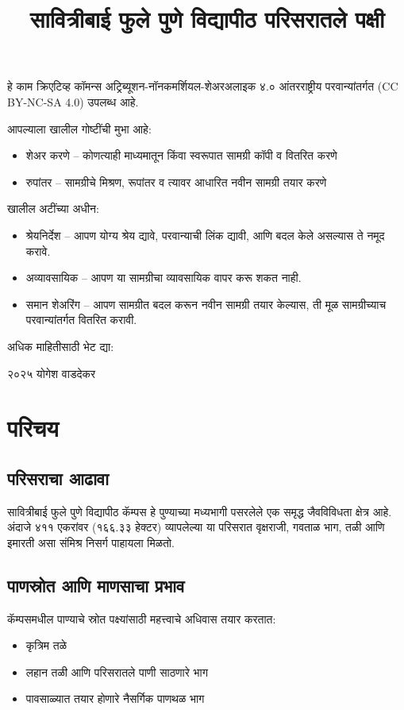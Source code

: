 \documentclass[a4paper,12pt,landscape]{memoir}
\title{सावित्रीबाई फुले पुणे विद्यापीठ परिसरातले पक्षी}
\author{}
\date{}
\newcommand{\introsection}[2]{%
  \begin{minipage}[t]{0.48\textwidth}
    \begin{mdframed}[
      linecolor=headingcolor,
      linewidth=1pt,
      roundcorner=5pt,
      leftmargin=0pt,
      rightmargin=0pt,
      backgroundcolor=headingcolor!5
    ]
      #1
    \end{mdframed}
  \end{minipage}\hfill
  \begin{minipage}[t]{0.48\textwidth}
    \begin{mdframed}[
      linecolor=headingcolor,
      linewidth=1pt,
      roundcorner=5pt,
      leftmargin=0pt,
      rightmargin=0pt,
      backgroundcolor=headingcolor!5
    ]
      #2
    \end{mdframed}
  \end{minipage}
  \newpage
}
\begin{document}
\maketitle

\begin{center}
\vspace{1cm}
{\large हे काम क्रिएटिव्ह कॉमन्स अट्रिब्यूशन-नॉनकमर्शियल-शेअरअलाइक ४.० आंतरराष्ट्रीय परवान्यांतर्गत ({\latintext CC BY-NC-SA 4.0}) उपलब्ध आहे.}

\vspace{0.5cm}
{\normalsize आपल्याला खालील गोष्टींची मुभा आहे:
\begin{itemize}
\item शेअर करणे -- कोणत्याही माध्यमातून किंवा स्वरूपात सामग्री कॉपी व वितरित करणे
\item रुपांतर -- सामग्रीचे मिश्रण, रूपांतर व त्यावर आधारित नवीन सामग्री तयार करणे
\end{itemize}

खालील अटींच्या अधीन:
\begin{itemize}
\item श्रेयनिर्देश -- आपण योग्य श्रेय द्यावे, परवान्याची लिंक द्यावी, आणि बदल केले असल्यास ते नमूद करावे.
\item अव्यावसायिक -- आपण या सामग्रीचा व्यावसायिक वापर करू शकत नाही.
\item समान शेअरिंग -- आपण सामग्रीत बदल करून नवीन सामग्री तयार केल्यास, ती मूळ सामग्रीच्याच परवान्यांतर्गत वितरित करावी.
\end{itemize}
}

\vspace{0.5cm}
{\small अधिक माहितीसाठी भेट द्या: {}}

\vspace{1cm}
{\large{\latintext \textcopyright} २०२५ योगेश वाडदेकर}
\end{center}


\chapter*{परिचय}
\introsection{%
  \section*{परिसराचा आढावा}
  सावित्रीबाई फुले पुणे विद्यापीठ कॅम्पस हे पुण्याच्या मध्यभागी पसरलेले एक समृद्ध जैवविविधता क्षेत्र आहे. अंदाजे ४११ एकरांवर (१६६.३३ हेक्टर) व्यापलेल्या या परिसरात वृक्षराजी, गवताळ भाग, तळी आणि इमारती असा संमिश्र निसर्ग पाहायला मिळतो. 
}{%
  \section*{पाणस्रोत आणि माणसाचा प्रभाव}
  कॅम्पसमधील पाण्याचे स्रोत पक्ष्यांसाठी महत्त्वाचे अधिवास तयार करतात:
  \begin{itemize}
  \item कृत्रिम तळे
  \item लहान तळी आणि परिसरातले पाणी साठणारे भाग
  \item पावसाळ्यात तयार होणारे नैसर्गिक पाणथळ भाग
  \end{itemize}
}
\end{document}
